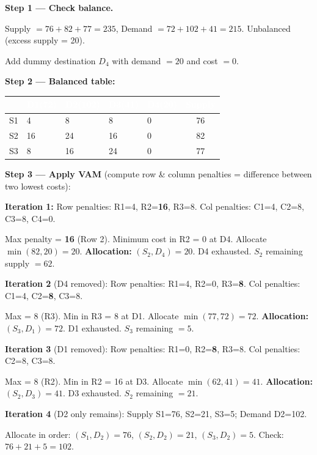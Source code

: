 \documentclass[12pt]{article}
\begin{document}
\begin{ansbox}
\textbf{Step 1 — Check balance.}

Supply $= 76+82+77 = 235$,\; Demand $= 72+102+41 = 215$.\; Unbalanced (excess supply = 20).

Add dummy destination $D_4$ with demand $= 20$ and cost $= 0$.

\medskip
\textbf{Step 2 — Balanced table:}

\begin{center}
\begin{tabular}{|c|C{1.4cm}|C{1.4cm}|C{1.4cm}|C{1.4cm}|c|}
\hline
{}
\textcolor{white}{\textbf{}} & \textcolor{white}{\textbf{D1(72)}} & \textcolor{white}{\textbf{D2(102)}} & \textcolor{white}{\textbf{D3(41)}} & \textcolor{white}{\textbf{D4(20)}} & \textcolor{white}{\textbf{Supply}}\\
\hline
S1 & 4 & 8 & 8 & 0 & 76 \\\hline
S2 & 16 & 24 & 16 & 0 & 82 \\\hline
S3 & 8 & 16 & 24 & 0 & 77 \\\hline
\end{tabular}
\end{center}

\medskip
\textbf{Step 3 — Apply VAM} (compute row \& column penalties = difference between two lowest costs):

\textbf{Iteration 1:} Row penalties: R1=4, R2=\textbf{16}, R3=8.\; Col penalties: C1=4, C2=8, C3=8, C4=0.

Max penalty = \textbf{16} (Row 2). Minimum cost in R2 = 0 at D4. Allocate $\min(82,20)=20$.
\quad\textbf{Allocation:} $(S_2,D_4)=20$. D4 exhausted. $S_2$ remaining supply $=62$.

\textbf{Iteration 2} (D4 removed): Row penalties: R1=4, R2=0, R3=\textbf{8}.\; Col penalties: C1=4, C2=\textbf{8}, C3=8.

Max = 8 (R3). Min in R3 = 8 at D1. Allocate $\min(77,72)=72$.
\quad\textbf{Allocation:} $(S_3,D_1)=72$. D1 exhausted. $S_3$ remaining $=5$.

\textbf{Iteration 3} (D1 removed): Row penalties: R1=0, R2=\textbf{8}, R3=8.\; Col penalties: C2=8, C3=8.

Max = 8 (R2). Min in R2 = 16 at D3. Allocate $\min(62,41)=41$.
\quad\textbf{Allocation:} $(S_2,D_3)=41$. D3 exhausted. $S_2$ remaining $=21$.

\textbf{Iteration 4} (D2 only remains): Supply S1=76, S2=21, S3=5; Demand D2=102.

Allocate in order: $(S_1,D_2)=76$,\; $(S_2,D_2)=21$,\; $(S_3,D_2)=5$.
\quad Check: $76+21+5=102$.\;\checkmark


\end{ansbox}
\end{document}
